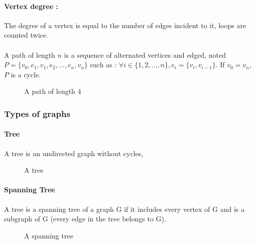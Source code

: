 \paragraph{Vertex degree :}
The degree of a vertex is equal to the number of edges incident to it, loops
are counted twice.

\paragraph{}
A path of length $n$ is a sequence of alternated vertices and edged, noted
$P = \{v_0, e_1, v_1, e_2, ..., e_n, v_n\}$ such as :
$\forall i \in \{1,2, ..., n\}, e_i = \{v_i, v_{i-1}\}$. If $v_0 = v_n$, $P$ is
a cycle.

\begin{figure}[!h]
  \begin{center}
    
  \end{center}
  \caption{A path of length 4}
\end{figure}


\subsubsection{Types of graphs}

\paragraph{Tree}
A tree is an undirected graph without cycles,

\begin{figure}[!h]
  \begin{center}
    
  \end{center}
  \caption{A tree}
\end{figure}

\paragraph{Spanning Tree}
A tree is a spanning tree of a graph G if it includes every vertex of G and is a subgraph of G (every edge in the tree belongs to G).

\begin{figure}[!h]
  \begin{center}
    
  \end{center}
  \caption{A spanning tree}
\end{figure}


